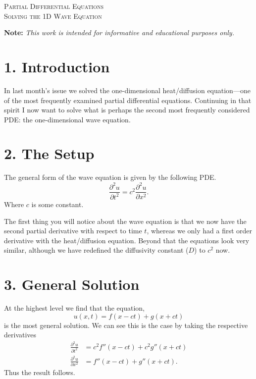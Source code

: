 \documentclass[11pt]{article}
\begin{document}

\begin{tcolorbox}
\begin{center}
    \large
    \textsc{Partial Differential Equations \\ Solving the 1D Wave Equation}
\end{center}
\end{tcolorbox}

\begin{center}
\textbf{Note:} \textit{This work is intended for informative and educational purposes only.}
\end{center}

\section*{1. Introduction}
In last month's issue we solved the one-dimensional heat/diffusion equation––one of the most frequently examined partial differential equations. Continuing in that spirit I now want to solve what is perhaps the second most frequently considered PDE: the one-dimensional wave equation.

\section*{2. The Setup}
The general form of the wave equation is given by the following PDE.
\begin{equation}
    \frac{\partial^2 u}{\partial t^2} = c^2 \frac{\partial^2 u}{\partial x^2}.
\end{equation}
Where $c$ is some constant. 

The first thing you will notice about the wave equation is that we now have the second partial derivative with respect to time $t$, whereas we only had a first order derivative with the heat/diffusion equation. Beyond that the equations look very similar, although we have redefined the diffusivity constant ($D$) to $c^2$ now. 

\section*{3. General Solution}
At the highest level we find that the equation,
\begin{equation}
    u(x,t) = f(x-ct) + g(x+ct)
\end{equation}
is the most general solution. We can see this is the case by taking the respective derivatives
\begin{align}
    \frac{\partial^2 u}{\partial t^2} &= c^2 f''(x-ct) + c^2 g''(x+ct) \\
    \frac{\partial^2 u}{\partial x^2} &= f''(x-ct) + g''(x+ct).
\end{align}
Thus the result follows. 
\end{document}
